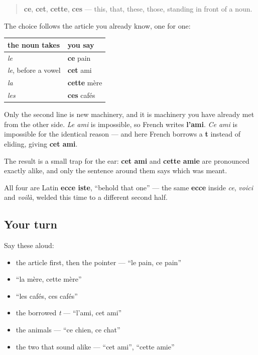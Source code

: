 \begin{cousinweb}
\begin{quote}
\textbf{ce}, \textbf{cet}, \textbf{cette}, \textbf{ces} — this, that, these, those, standing in front of a noun.
\end{quote}

The choice follows the article you already know, one for one:

\noindent
\begin{tabularx}{\linewidth}{@{}>{\raggedright\arraybackslash}X>{\raggedright\arraybackslash}X@{}}
\toprule
\textbf{the noun takes} & \textbf{you say} \\
\midrule
\emph{le} & \textbf{ce} pain \\
\emph{le}, before a vowel & \textbf{cet} ami \\
\emph{la} & \textbf{cette} mère \\
\emph{les} & \textbf{ces} cafés \\
\bottomrule
\end{tabularx}

Only the second line is new machinery, and it is machinery you have already met from the other side. \emph{Le ami} is impossible, so French writes \textbf{l'ami}. \emph{Ce ami} is impossible for the identical reason — and here French borrows a \textbf{t} instead of eliding, giving \textbf{cet ami}.

The result is a small trap for the ear: \textbf{cet ami} and \textbf{cette amie} are pronounced exactly alike, and only the sentence around them says which was meant.

All four are Latin \textbf{ecce iste}, \textquotedblleft{}behold that one\textquotedblright{} — the same \textbf{ecce} inside \emph{ce}, \emph{voici} and \emph{voilà}, welded this time to a different second half.
\end{cousinweb}

\subsection*{Your turn}
Say these aloud:

\begin{itemize}
\raggedright
  \item the article first, then the pointer — \textquotedblleft{}le pain, ce pain\textquotedblright{}
  \item \textquotedblleft{}la mère, cette mère\textquotedblright{}
  \item \textquotedblleft{}les cafés, ces cafés\textquotedblright{}
  \item the borrowed \emph{t} — \textquotedblleft{}l'ami, cet ami\textquotedblright{}
  \item the animals — \textquotedblleft{}ce chien, ce chat\textquotedblright{}
  \item the two that sound alike — \textquotedblleft{}cet ami\textquotedblright{}, \textquotedblleft{}cette amie\textquotedblright{}
\end{itemize}

